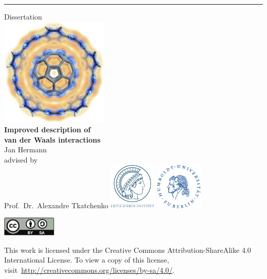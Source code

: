 \documentclass[12pt,a4paper,twoside]{report}
\makeatletter
\def\cleardoublepage{\clearpage
  \ifodd%
    \c@page%
  \else
    \hbox{}
    \thispagestyle{empty}
    \newpage
  \fi
}
\makeatother
\begin{document}
\pagestyle{fancy}

\listoftodos%
\cleardoublepage%

\begin{titlepage}
\sffamily\centering
\hrule
\vfill
{\Large Dissertation}\\
\vfill
\includegraphics[height=14em]{media/10cpp-c60-cloud.png}\\
\vfill
{\Huge\bfseries
Improved description of \\
van der Waals interactions}\\
\vfill
{\Large Jan Hermann}\\
\vspace{1em}
{\large advised by\\
Prof.\ Dr.\ Alexandre Tkatchenko}
\vfill
\includegraphics[height=6em]{media/logo-fhi.pdf}
\hfill
\includegraphics[height=6em]{media/logo-hu.pdf}
\end{titlepage}
\thispagestyle{empty}
\restoregeometry%
\clearpage

\vspace*{\fill}
\begin{center}
\small
\includegraphics[height=2.5em]{media/by-sa.pdf}
\vspace{.5em}

This work is licensed under the Creative Commons Attribution-ShareAlike 4.0 International License. To view a copy of this license, visit~\url{http://creativecommons.org/licenses/by-sa/4.0/}.
\end{center}
\cleardoublepage%

\tableofcontents
\cleardoublepage%



\cleardoublepage%



\cleardoublepage%
\begingroup
\renewcommand{\section}[2]{}
\setlength\bibsep{0pt}
\footnotesize

\endgroup
\end{document}
